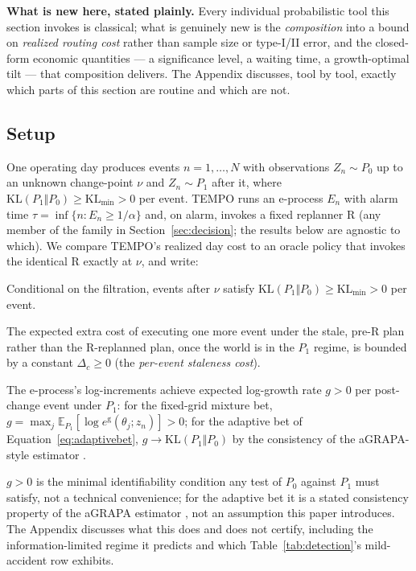 \documentclass[trsc,dblanonrev]{informs4}
\newcommand{\E}{\mathbb{E}}
\newcommand{\KL}{\mathrm{KL}}
\newcommand{\Rmax}{\mathrm{R}}
\begin{document}
\textbf{What is new here, stated plainly.} Every individual
probabilistic tool this section invokes is classical; what is genuinely
new is the \emph{composition} into a bound on \emph{realized routing
cost} rather than sample size or type-I/II error, and the closed-form
economic quantities --- a significance level, a waiting time, a
growth-optimal tilt --- that composition delivers. The Appendix
discusses, tool by tool, exactly which parts of this section are
routine and which are not.

\subsection{Setup}

One operating day produces events $n = 1, \dots, N$ with observations
$Z_n \sim P_0$ up to an unknown change-point $\nu$ and $Z_n \sim P_1$
after it, where $\KL(P_1 \Vert P_0) \ge \KL_{\min} > 0$ per event. TEMPO
runs an e-process $E_n$ with alarm time $\tau = \inf\{n : E_n \ge
1/\alpha\}$ and, on alarm, invokes a fixed replanner $\Rmax$ (any member
of the family in Section~\ref{sec:decision}; the results below are
agnostic to which). We compare TEMPO's realized day cost to an oracle
policy that invokes the identical $\Rmax$ exactly at $\nu$, and write:

\begin{assumption}\label{ass:kl}
Conditional on the filtration, events after $\nu$ satisfy
$\KL(P_1 \Vert P_0) \ge \KL_{\min} > 0$ per event.
\end{assumption}

\begin{assumption}\label{ass:staleness}
The expected extra cost of executing one more event under the stale,
pre-$\Rmax$ plan rather than the $\Rmax$-replanned plan, once the world
is in the $P_1$ regime, is bounded by a constant $\Delta_c \ge 0$ (the
\emph{per-event staleness cost}).
\end{assumption}

\begin{assumption}\label{ass:growth}
The e-process's log-increments achieve expected log-growth rate $g > 0$
per post-change event under $P_1$: for the fixed-grid mixture bet,
$g = \max_j \E_{P_1}[\log e^{\mathrm g}(\theta_j; z_n)] > 0$; for the
adaptive bet of Equation~\eqref{eq:adaptivebet}, $g \to \KL(P_1\Vert
P_0)$ by the consistency of the aGRAPA-style estimator
\citep{waudbysmithramdas2024}.
\end{assumption}

\begin{remark}\label{rem:growth}
$g > 0$ is the minimal identifiability condition any test of $P_0$
against $P_1$ must satisfy, not a technical convenience; for the
adaptive bet it is a stated consistency property of the aGRAPA
estimator \citep{waudbysmithramdas2024}, not an assumption this paper
introduces. The Appendix discusses what this does and does not
certify, including the information-limited regime it predicts and
which Table~\ref{tab:detection}'s mild-accident row exhibits.
\end{remark}
\end{document}
